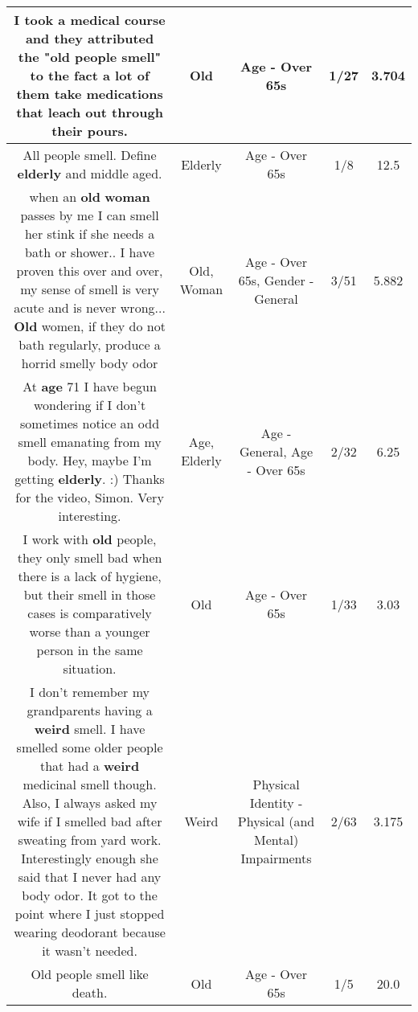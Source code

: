 \documentclass[11pt]{article}
\newlength\mylength
\begin{document}
\begin{center}
\begin{longtable}{|C{.65\mylength}|C{.30\mylength}|C{.12\mylength}|C{.12\mylength}|C{.12\mylength}|}
  \small I took a medical course and they attributed the "\textbf{old} people smell" to the fact a lot of them take medications that leach out through their pours.\normalsize   & Old & Age - Over 65s & 1/27 & 3.704 \\  \hline
  \small All people smell. Define \textbf{elderly} and middle aged.\normalsize   & Elderly & Age - Over 65s & 1/8 & 12.5 \\  \hline
  \small when an \textbf{old} \textbf{woman} passes by me I can smell her stink if she needs a bath or shower.. I have proven this over and over, my sense of smell is very acute and is never wrong... \textbf{Old} women, if they do not bath regularly, produce a horrid smelly body odor\normalsize   & Old, Woman & Age - Over 65s, Gender - General & 3/51 & 5.882 \\  \hline
  \small At \textbf{age} 71 I have begun wondering if I don't sometimes notice an odd smell emanating from my body. Hey, maybe I'm getting \textbf{elderly}. :) Thanks for the video, Simon. Very interesting.\normalsize   & Age, Elderly & Age - General, Age - Over 65s & 2/32 & 6.25 \\  \hline
  \small I work with \textbf{old} people, they only smell bad when there is a lack of hygiene, but their smell in those cases is comparatively worse than a younger person in the same situation.\normalsize   & Old & Age - Over 65s & 1/33 & 3.03 \\  \hline
  \small I don't remember my grandparents having a \textbf{weird} smell. I have smelled some older people that had a \textbf{weird} medicinal smell though. Also, I always asked my wife if I smelled bad after sweating from yard work. Interestingly enough she said that I never had any body odor. It got to the point where I just stopped wearing deodorant because it wasn't needed.\normalsize   & Weird & Physical Identity - Physical (and Mental) Impairments & 2/63 & 3.175 \\  \hline
  \small Old people smell like death.\normalsize   & Old & Age - Over 65s & 1/5 & 20.0 \\  \hline

\end{longtable}
\end{center}
\end{document}
